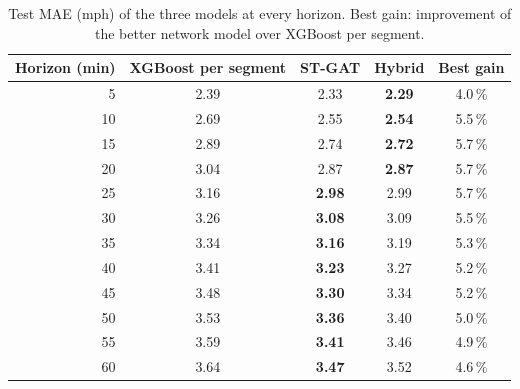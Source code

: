 \begin{table}[H]
\centering
\caption{Test MAE (mph) of the three models at every horizon. Best gain: improvement of the better network model over XGBoost per segment.}
\label{tab:horizondetail}
\small
\begin{tabular}{rcccc}
\toprule
Horizon (min) & XGBoost per segment & ST-GAT & Hybrid & Best gain \\
\midrule
5 & 2.39 & 2.33 & \textbf{2.29} & 4.0\,\% \\
10 & 2.69 & 2.55 & \textbf{2.54} & 5.5\,\% \\
15 & 2.89 & 2.74 & \textbf{2.72} & 5.7\,\% \\
20 & 3.04 & 2.87 & \textbf{2.87} & 5.7\,\% \\
25 & 3.16 & \textbf{2.98} & 2.99 & 5.7\,\% \\
30 & 3.26 & \textbf{3.08} & 3.09 & 5.5\,\% \\
35 & 3.34 & \textbf{3.16} & 3.19 & 5.3\,\% \\
40 & 3.41 & \textbf{3.23} & 3.27 & 5.2\,\% \\
45 & 3.48 & \textbf{3.30} & 3.34 & 5.2\,\% \\
50 & 3.53 & \textbf{3.36} & 3.40 & 5.0\,\% \\
55 & 3.59 & \textbf{3.41} & 3.46 & 4.9\,\% \\
60 & 3.64 & \textbf{3.47} & 3.52 & 4.6\,\% \\
\bottomrule
\end{tabular}
\end{table}